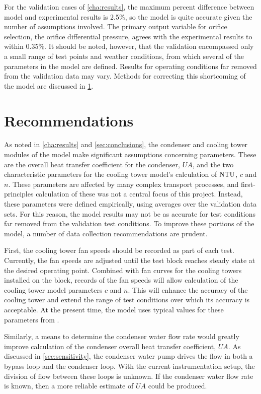 For the validation cases of \cref{cha:results}, the maximum percent difference between model
and experimental results is 2.5\%, so the model is quite accurate given the number of assumptions involved.
The primary output variable for orifice selection, the orifice differential pressure,
agrees with the experimental results to within 0.35\%.
It should be noted, however, that the validation encompassed only a
small range of test points and weather conditions, from which several
of the parameters in the model are defined.
Results for operating conditions far removed from the validation data
may vary.
Methods for correcting this shortcoming of the model are discussed in \cref{sec:recommend}.

\section{Recommendations} \label{sec:recommend}
As noted in \cref{cha:results} and \cref{sec:conclusions},
the condenser and cooling tower modules of the model make significant
assumptions concerning parameters.
These are the overall heat transfer coefficient for the condenser, $UA$,
and the two characteristic parameters for the cooling tower model's 
calculation of $\mathrm{NTU}$, $c$ and $n$.
These parameters are affected by many complex transport processes,
and first-principles calculation of these was not a central focus of this project.
Instead, these parameters were defined empirically, using averages over the 
validation data sets.
For this reason, the model results may not be as accurate for test conditions
far removed from the validation test conditions.
To improve these portions of the model, a number of data collection
recommendations are prudent.

First, the cooling tower fan speeds should be recorded as part of each test.
Currently, the fan speeds are adjusted until the test block reaches steady state
at the desired operating point.
Combined with fan curves for the cooling towers installed on the block,
records of the fan speeds will allow calculation of the cooling tower
model parameters $c$ and $n$. 
This will enhance the accuracy of the cooling tower and extend the range
of test conditions over which its accuracy is acceptable.
At the present time, the model uses typical values for these parameters from \textcite{braun1989}.

Similarly, a means to determine the condenser water flow rate would
greatly improve calculation of the condenser overall heat transfer coefficient, $UA$.
As discussed in \cref{sec:sensitivity}, the condenser water pump drives the
flow in both a bypass loop and the condenser loop. With the current instrumentation
setup, the division of flow between these loops is unknown.
If the condenser water flow rate is known, then a more reliable
estimate of $UA$ could be produced.

